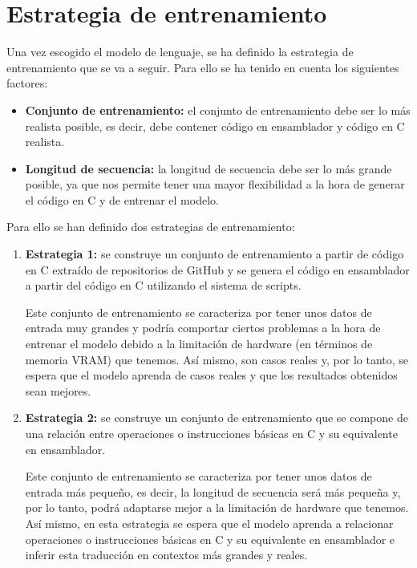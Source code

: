 \section{Estrategia de entrenamiento}
\label{sec:estrategia_entrenamiento}

Una vez escogido el modelo de lenguaje, se ha definido la estrategia de entrenamiento
que se va a seguir. Para ello se ha tenido en cuenta los siguientes factores:

\begin{itemize}
    \item \textbf{Conjunto de entrenamiento:} el conjunto de entrenamiento debe ser
        lo más realista posible, es decir, debe contener código en ensamblador y código
        en C realista.
    \item \textbf{Longitud de secuencia:} la longitud de secuencia debe ser lo más
        grande posible, ya que nos permite tener una mayor flexibilidad a la hora de
        generar el código en C y de entrenar el modelo.
\end{itemize}

Para ello se han definido dos estrategias de entrenamiento:

\begin{enumerate}
    \item \textbf{Estrategia 1:} se construye un conjunto de entrenamiento a partir
        de código en C extraído de repositorios de GitHub y se genera el código en
        ensamblador a partir del código en C utilizando el sistema de scripts.

        Este conjunto de entrenamiento se caracteriza por tener unos datos de entrada
        muy grandes y podría comportar ciertos problemas a la hora de entrenar el modelo
        debido a la limitación de hardware (en términos de memoria VRAM) que tenemos. Así
        mismo, son casos reales y, por lo tanto, se espera que el modelo aprenda de casos
        reales y que los resultados obtenidos sean mejores.

    \item \textbf{Estrategia 2:} se construye un conjunto de entrenamiento que se compone
        de una relación entre operaciones o instrucciones básicas en C y su equivalente
        en ensamblador.

        Este conjunto de entrenamiento se caracteriza por tener unos datos de entrada
        más pequeño, es decir, la longitud de secuencia será más pequeña y, por lo tanto,
        podrá adaptarse mejor a la limitación de hardware que tenemos. Así mismo, en esta 
        estrategia se espera que el modelo aprenda a relacionar operaciones o instrucciones
        básicas en C y su equivalente en ensamblador e inferir esta traducción en contextos más
        grandes y reales.
\end{enumerate}









